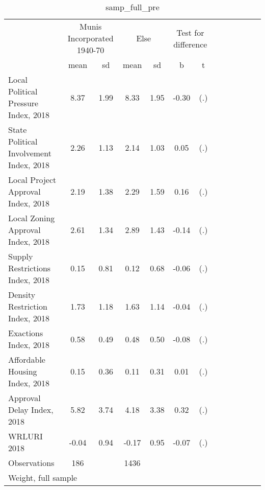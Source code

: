 \begin{table}[htbp]\centering
\def\sym#1{\ifmmode^{#1}\else\(^{#1}\)\fi}
\caption{samp\_full\_pre \label{tab1}}
\begin{tabular}{l*{3}{cccc}}
\toprule
                    &\multicolumn{2}{c}{Munis Incorporated 1940-70}&\multicolumn{2}{c}{Else} &\multicolumn{2}{c}{Test for difference}\\
                    &        mean&          sd&        mean&          sd&           b         &           t\\
\midrule
Local Political Pressure Index, 2018&        8.37&        1.99&        8.33&        1.95&       -0.30         &         (.)\\
State Political Involvement Index, 2018&        2.26&        1.13&        2.14&        1.03&        0.05         &         (.)\\
Local Project Approval Index, 2018&        2.19&        1.38&        2.29&        1.59&        0.16         &         (.)\\
Local Zoning Approval Index, 2018&        2.61&        1.34&        2.89&        1.43&       -0.14         &         (.)\\
Supply Restrictions Index, 2018&        0.15&        0.81&        0.12&        0.68&       -0.06         &         (.)\\
Density Restriction Index, 2018&        1.73&        1.18&        1.63&        1.14&       -0.04         &         (.)\\
Exactions Index, 2018&        0.58&        0.49&        0.48&        0.50&       -0.08         &         (.)\\
Affordable Housing Index, 2018&        0.15&        0.36&        0.11&        0.31&        0.01         &         (.)\\
Approval Delay Index, 2018&        5.82&        3.74&        4.18&        3.38&        0.32         &         (.)\\
WRLURI 2018         &       -0.04&        0.94&       -0.17&        0.95&       -0.07         &         (.)\\
\midrule
Observations        &         186&            &        1436&            &                     &            \\
\bottomrule
\multicolumn{7}{l}{\footnotesize Weight, full sample}\\
\end{tabular}
\end{table}

